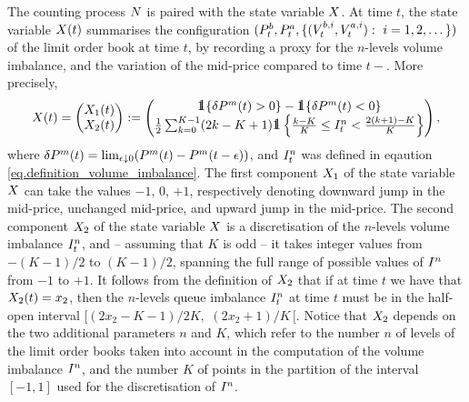 \documentclass[10pt, article,table]{article}
\begin{document}
The counting process $\multiCountingProc$ is paired with the state variable $\stateVariable$. At time $t$, the state variable $\stateVariable(t)$ summarises the configuration $(\bestBidPrice_t,\bestAskPrice_t,\lbrace( \nthBestBidVolume[i]_t, \nthBestAskVolume[i]_t): \, \, i=1,2,\dots \rbrace)$ of the limit order book at time $t$, by recording a proxy for the $n$-levels volume imbalance, and the variation of the mid-price compared to time $t-$. More precisely, 
\begin{equation}\label{eq.state-variable}
 \stateVariable(t)
 =
 \begin{pmatrix}
 \stateVariable_1 (t)
 \\
 \stateVariable_2(t)
 \end{pmatrix}
 :=
 \begin{pmatrix}
 \one\lbrace\delta\midprice(t)>0\rbrace - \one\lbrace\delta\midprice(t)<0\rbrace
 \\
 \half\sum_{k=0}^{K-1} (2k-K+1 )\one\left\lbrace \frac{k-K}{K} \leq \volumeImbalance^n_t < \frac{2(k+1)-K}{K} \right\rbrace
 \end{pmatrix},
\end{equation}
where $\delta\midprice(t) = \lim_{\epsilon\downarrow 0} (\midprice(t) - \midprice(t-\epsilon) )$, and $\volumeImbalance^{n}_t$ was defined in eqaution \eqref{eq.definition_volume_imbalance}. The first component $\stateVariable_1$ of the state variable $\stateVariable$ can take the values $-1$, $0$, $+1$, respectively denoting downward jump in the mid-price, unchanged mid-price, and upward jump in the mid-price. The second component $\stateVariable_2$ of the state variable $\stateVariable$ is a discretisation of the $n$-levels volume imbalance $\volumeImbalance^{n}_t$, and -- assuming that $K$ is odd -- it takes integer values from $-(K-1)/2$ to $(K-1)/2$, spanning the full range of possible values of $\volumeImbalance^n$ from $-1$ to $+1$. 
It follows from the definition of $\stateVariable_2$ that if at time $t$ we have that $\stateVariable_2 (t) = x_2$, then the $n$-levels queue imbalance $\volumeImbalance^n_t$ at time $t$ must be in the half-open interval $[(2x_2 -K -1)/2K, \, \, (2x_2 +1)/K \, [$.
Notice that $\stateVariable_2$ depends on the two additional parameters $n$ and $K$, which refer to the number $n$ of levels of the limit order books taken into account in the computation of the volume imbalance $\volumeImbalance^n$, and the number $K$ of points in the partition of the interval $[-1,1]$  used for the discretisation of $\volumeImbalance^n$. 
\end{document}
